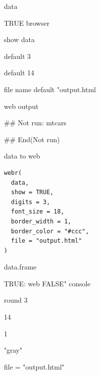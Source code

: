 \documentclass[a4paper]{book}
\begin{document}
%
\begin{Arguments}
\begin{ldescription}
\item[\code{data}] data

\item[\code{out}] TRUE browser

\item[\code{tibble}] show data

\item[\code{digits}] default 3

\item[\code{font\_size}] default 14

\item[\code{file}] file name default "output.html
\end{ldescription}
\end{Arguments}
%
\begin{Value}
web output
\end{Value}
%
\begin{Examples}
\begin{ExampleCode}

## Not run: 
mtcars%


## End(Not run)

\end{ExampleCode}
\end{Examples}
%
\begin{Description}
data to web
\end{Description}
%
\begin{Usage}
\begin{verbatim}
webr(
  data,
  show = TRUE,
  digits = 3,
  font_size = 18,
  border_width = 1,
  border_color = "#ccc",
  file = "output.html"
)
\end{verbatim}
\end{Usage}
%
\begin{Arguments}
\begin{ldescription}
\item[\code{data}] data.frame

\item[\code{show}] TRUE: web FALSE" console

\item[\code{digits}] round 3

\item[\code{font\_size}] 14

\item[\code{border\_width}] 1

\item[\code{border\_color}] "gray"

\item[\code{file}] file = "output.html"
\end{ldescription}
\end{Arguments}
\end{document}
